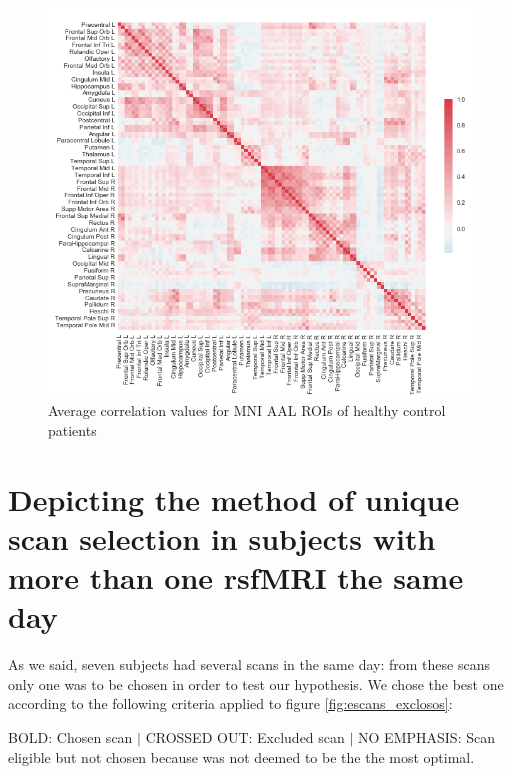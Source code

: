 \begin{figure}[h]
	\centering
	\includegraphics[width=\textwidth]{mitjana_ROIxROI_controls_ELIMINATS15PROBLEMATICS.png}
	\caption{Average correlation values for MNI AAL ROIs of healthy control patients}
\end{figure}



\clearpage






	\section{Depicting the method of unique scan selection in subjects with more than one rsfMRI the same day} \label{escollir_escaners_repetits_dun_mateix_dia}

As we said, seven subjects had several scans in the same day: from these scans only one was to be chosen in order to test our hypothesis. We chose the best one according to the following criteria applied to figure \ref{fig:escans_exclosos}: 

BOLD:  Chosen scan $|$ CROSSED OUT: Excluded scan $|$ NO EMPHASIS: Scan eligible but not chosen because was not deemed to be the the most optimal.



